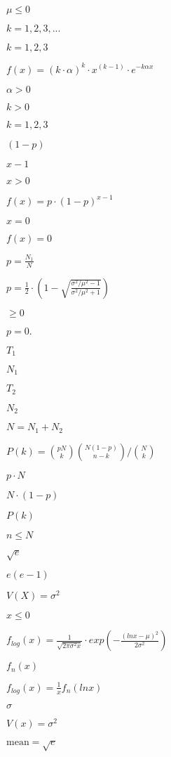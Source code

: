 \documentclass{article}
\begin{document}
$\mu \leq 0$
\pagebreak

$k = 1,2,3,...$
\pagebreak

$k=1,2,3$
\pagebreak

$ f(x) = (k \cdot \alpha)^k \cdot x^{(k - 1)} \cdot e^{-k \alpha x} $
\pagebreak

$\alpha > 0$
\pagebreak

$k > 0$
\pagebreak

$k = 1, 2, 3$
\pagebreak

$(1-p)$
\pagebreak

$x-1$
\pagebreak

$x > 0$
\pagebreak

$ f(x) = p \cdot (1-p)^{x-1} $
\pagebreak

$x = 0$
\pagebreak

$f(x) = 0$
\pagebreak

$p = \frac{N_1}{N}$
\pagebreak

$p = \frac{1}{2} \cdot (1 - \sqrt{\frac{\sigma^2 / \mu^2 - 1}{\sigma^2 / \mu^2 + 1}})$
\pagebreak

$\geq 0$
\pagebreak

$p = 0.$
\pagebreak

$T_1$
\pagebreak

$N_1$
\pagebreak

$T_2$
\pagebreak

$N_2$
\pagebreak

$N = N_1 + N_2$
\pagebreak

$ P(k) = {pN \choose k} {N(1 - p) \choose n - k} / {N \choose k} $
\pagebreak

$p \cdot N$
\pagebreak

$N \cdot (1 - p)$
\pagebreak

$P(k)$
\pagebreak

$n \leq N$
\pagebreak

$\sqrt{e}$
\pagebreak

$e(e-1)$
\pagebreak

$V(X)=\sigma^2$
\pagebreak

$x \leq 0$
\pagebreak

$ f_{log}(x) = \frac{1}{\sqrt{2 \pi \sigma^2 x}} \cdot exp \left(- \frac{(ln x - \mu)^2}{2 \sigma^2}\right) $
\pagebreak

$f_n(x)$
\pagebreak

$f_{log}(x) = \frac{1}{x}f_n(ln x)$
\pagebreak

$\sigma$
\pagebreak

$V(x) = \sigma^2$
\pagebreak

$\mbox{mean} = \sqrt{e}$
\pagebreak
\end{document}
